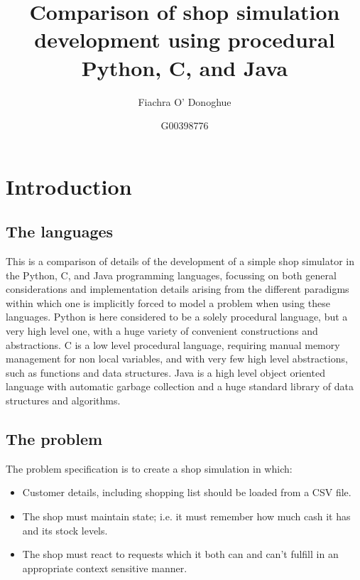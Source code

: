 \documentclass[12pt, a4paper]{article}
\title{Comparison of shop simulation development using procedural Python, C, and Java}
\author{Fiachra O' Donoghue}
\date{%
    G00398776\\%
}
\begin{document}
\maketitle

\section{Introduction}

\subsection{The languages}
This is a comparison of details of the development of a simple shop simulator in the Python, C, and Java programming languages, focussing on both general considerations and implementation details arising from the different paradigms within which one is implicitly forced to model a problem when using these languages. Python is here considered to be a solely procedural language, but a very high level one, with a huge variety of convenient constructions and abstractions. C is a low level procedural language, requiring manual memory management for non local variables, and with very few high level abstractions, such as functions and data structures. Java is a high level object oriented language with automatic garbage collection and a huge standard library of data structures and algorithms.

\subsection{The problem}
The problem specification is to create a shop simulation in which:
\begin{itemize}
    \item Customer details, including shopping list should be loaded from a CSV file.
    \item The shop must maintain state; i.e. it must remember how much cash it has and its stock levels.
    \item The shop must react to requests which it both can and can't fulfill in an appropriate context sensitive manner. 
\end{itemize}   
\end{document}
